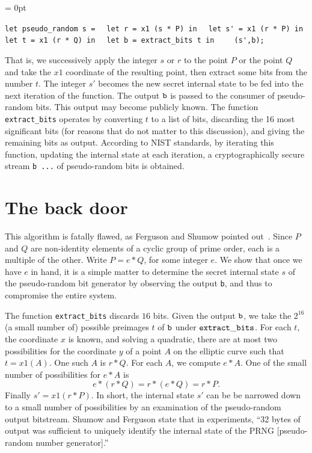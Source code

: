 \documentclass[11pt]{amsart} %
\begin{document}
\smallskip
{
\parskip = 0pt

\obeylines

\verb!let pseudo_random s =!
\verb!  let r = x1 (s * P) in!
\verb!  let s' = x1 (r * P) in!
\verb!  let t = x1 (r * Q) in!
\verb!  let b = extract_bits t in!
\verb!    (s',b);!

}

That is, we successively apply the integer $s$ or $r$ to the point $P$ or the point $Q$ and take the $x1$ coordinate of the resulting point,
then extract some bits from the number $t$.
The integer $s' $ becomes the new secret internal state to be fed into the next
iteration of the function.  The output ${\tt b}$ is passed to the consumer of pseudo-random bits.
This output may become publicly known.
The function {\tt extract\_bits} operates by converting $t$ to a list of bits, discarding
the 16 most significant bits (for reasons that do not matter to this discussion),
and giving the remaining bits as output.  According to NIST standards, by iterating this function,
updating the internal state at each iteration, a cryptographically secure stream {\tt b ...} 
of pseudo-random bits is obtained.

\section{The back door}

This algorithm is fatally flawed, as Ferguson and Shumow pointed out~\cite{FS2007}.
Since $P$ and $Q$ are non-identity elements of a cyclic group of prime order, each is a multiple of the other.
Write $P = e * Q$, for some integer $e$.   We show that once we have $e$ in hand, it is a simple
matter to determine the secret internal state $s$ of the pseudo-random bit generator by observing the output {\tt b},
and thus to compromise the entire system.

The function {\tt extract\_bits} discards $16$ bits.  Given the output ${\tt b}$, 
we take the $2^{16}$ (a small number of) possible preimages $t$ of ${\tt b}$ under ${\tt extract\_bits}$.
For each $t$, the coordinate $x$ is known, and solving a quadratic,
there are at most two possibilities for the coordinate $y$ of a point $A$ on the elliptic curve
such that $t = x1 (A)$.  One such $A$ is $r * Q$.  For each $A$, we compute $e * A$.    
One of the small number of possibilities for 
$e * A$ is 
\begin{equation}\label{eqn:diffie-hellman}
e * (r * Q) = r * (e * Q) = r * P.
\end{equation}
Finally $s' = x1 (r * P)$.  In short, the internal state $s'$ can be be narrowed down to a small number
of possibilities by an examination of the pseudo-random output bitstream.  Shumow and Ferguson
state that in experiments, ``32 bytes of output was sufficient to uniquely identify the internal
state of the PRNG [pseudo-random number generator].''
\end{document}
